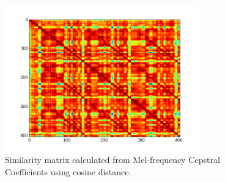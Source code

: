\begin{figure}[b]
    \includegraphics[width=0.75\textwidth]{Figures/mfcc_ssm_cosine}
    \centering

  \caption{Similarity matrix calculated from Mel-frequency Cepstral Coefficients using cosine distance.}
  \label{fig:anneval}
\end{figure}
